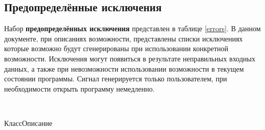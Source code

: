 \subsection{Предопределённые исключения}

Набор {\bf предопределённых исключения} представлен в таблице \ref{errors}. В данном документе, при описаниях возможности, представлены списки исключениях которые возможно будут сгенерированы при использовании конкретной возможности. Исключения могут появиться в результате неправильных входных данных, а также при невозможности использовании возможности в текущем состоянии программы. Сигнал  генерируется только пользователем, при необходимости открыть программу немедленно.

\ 

%
{Класс}{Описание}%
